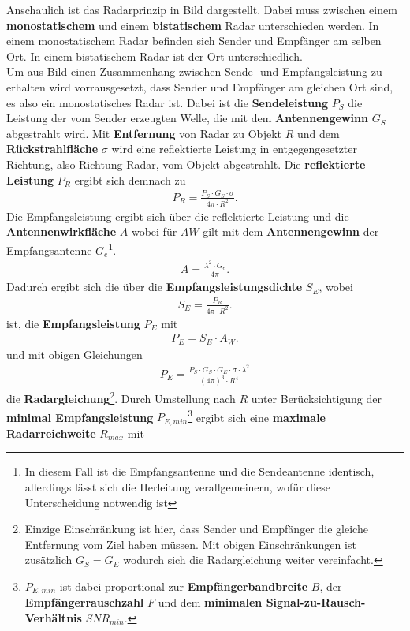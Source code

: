 Anschaulich ist das Radarprinzip in Bild dargestellt. Dabei muss zwischen einem \textbf{monostatischem} und einem \textbf{bistatischem} Radar unterschieden werden. In einem monostatischem Radar befinden sich Sender und Empfänger am selben Ort. In einem bistatischem Radar ist der Ort unterschiedlich. \\
Um aus Bild einen Zusammenhang zwischen Sende- und Empfangsleistung zu erhalten wird vorrausgesetzt, dass Sender und Empfänger am gleichen Ort sind, es also ein monostatisches Radar ist. Dabei ist die \textbf{Sendeleistung} $P_{S}$ die Leistung der vom Sender erzeugten Welle, die mit dem \textbf{Antennengewinn} $G_{S}$ abgestrahlt wird. Mit \textbf{Entfernung} von Radar zu Objekt $R$ und dem \textbf{Rückstrahlfläche} $\sigma$ wird eine reflektierte Leistung in entgegengesetzter Richtung, also Richtung Radar, vom Objekt abgestrahlt. Die \textbf{reflektierte Leistung} $P_{R}$ ergibt sich demnach zu
\begin{align}
P_{R} = \frac{P_{S} \cdot G_{S} \cdot \sigma}{4\pi \cdot R^2}.
\end{align} Die Empfangsleistung ergibt sich über die reflektierte Leistung und die \textbf{Antennenwirkfläche} $A$ wobei für $A{W}$ gilt mit dem \textbf{Antennengewinn} der Empfangsantenne $G_{e}$\footnote{In diesem Fall ist die Empfangsantenne und die Sendeantenne identisch, allerdings lässt sich die Herleitung verallgemeinern, wofür diese Unterscheidung notwendig ist}. 
\begin{align}
A = \frac{\lambda^2 \cdot G_{e}}{4\pi}.
\end{align}
Dadurch ergibt sich die über die \textbf{Empfangsleistungsdichte} $S_{E}$, wobei 
\begin{align}
S_{E} = \frac{P_{R}}{4\pi \cdot R^2}.
\end{align}
ist, die 
\textbf{Empfangsleistung} $P_{E}$ mit
\begin{align}
P_{E} = S_{E}\cdot A_{W}.
\end{align}
und mit obigen Gleichungen
\begin{align}
P_{E} = \frac{P_{S} \cdot G_{S} \cdot G_{E} \cdot \sigma \cdot \lambda^2}{(4\pi)^3\cdot R^4}
\end{align}
die \textbf{Radargleichung}\footnote{Einzige Einschränkung ist hier, dass Sender und Empfänger die gleiche Entfernung vom Ziel haben müssen. Mit obigen Einschränkungen ist zusätzlich $G_{S} = G_{E}$ wodurch sich die Radargleichung weiter vereinfacht.}.
Durch Umstellung nach $R$ unter Berücksichtigung der \textbf{minimal Empfangsleistung} $P_{E,min}$\footnote{$P_{E,min}$ ist dabei proportional zur \textbf{Empfängerbandbreite}
$B$, der \textbf{Empfängerrauschzahl} $F$ und dem \textbf{minimalen Signal-zu-Rausch-Verhältnis} $SNR_{min}$.} ergibt sich eine \textbf{maximale Radarreichweite} $R_{max}$ mit
